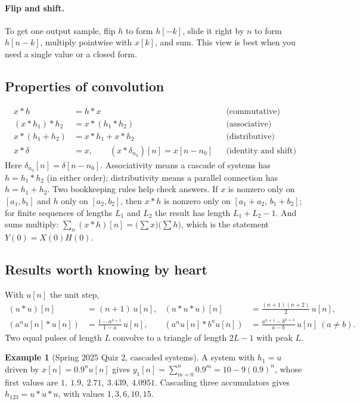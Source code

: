 \documentclass[11pt]{article}
\numberwithin{equation}{section}
\theoremstyle{definition}
\newtheorem{example}{Example}[section]
\theoremstyle{remark}
\begin{document}
\paragraph{Flip and shift.} To get one output sample, flip $h$ to form $h[-k]$, slide it right by
$n$ to form $h[n-k]$, multiply pointwise with $x[k]$, and sum. This view is best when you need
a single value or a closed form.

\subsection{Properties of convolution}
\begin{align}
x*h&=h*x &&\text{(commutative)}\\
(x*h_1)*h_2&=x*(h_1*h_2) &&\text{(associative)}\\
x*(h_1+h_2)&=x*h_1+x*h_2 &&\text{(distributive)}\\
x*\delta&=x,\qquad (x*\delta_{n_0})[n]=x[n-n_0] &&\text{(identity and shift)}
\end{align}
Here $\delta_{n_0}[n]=\delta[n-n_0]$. Associativity means a cascade of systems has
$h=h_1*h_2$ (in either order); distributivity means a parallel connection has $h=h_1+h_2$.
Two bookkeeping rules help check answers. If $x$ is nonzero only on $[a_1,b_1]$ and $h$ only on
$[a_2,b_2]$, then $x*h$ is nonzero only on $[a_1+a_2,\,b_1+b_2]$; for finite sequences of lengths
$L_1$ and $L_2$ the result has length $L_1+L_2-1$. And sums multiply:
$\sum_n(x*h)[n]=\big(\sum x\big)\big(\sum h\big)$, which is the statement $Y(0)=X(0)H(0)$.

\subsection{Results worth knowing by heart}
With $u[n]$ the unit step,
\begin{align}
(u*u)[n]&=(n+1)\,u[n], &
(u*u*u)[n]&=\frac{(n+1)(n+2)}{2}\,u[n],\\
(a^nu[n]*u[n])&=\frac{1-a^{n+1}}{1-a}\,u[n], &
(a^nu[n]*b^nu[n])&=\frac{a^{n+1}-b^{n+1}}{a-b}\,u[n]\ (a\ne b).
\end{align}
Two equal pulses of length $L$ convolve to a triangle of length $2L-1$ with peak $L$.

\begin{example}[Spring 2025 Quiz 2, cascaded systems]
A system with $h_1=u$ driven by $x[n]=0.9^nu[n]$ gives
$y_1[n]=\sum_{m=0}^{n}0.9^m=10-9(0.9)^n$, whose first values are $1,\ 1.9,\ 2.71,\ 3.439,\ 4.0951$.
Cascading three accumulators gives $h_{123}=u*u*u$, with values $1,3,6,10,15$.
\end{example}
\end{document}
